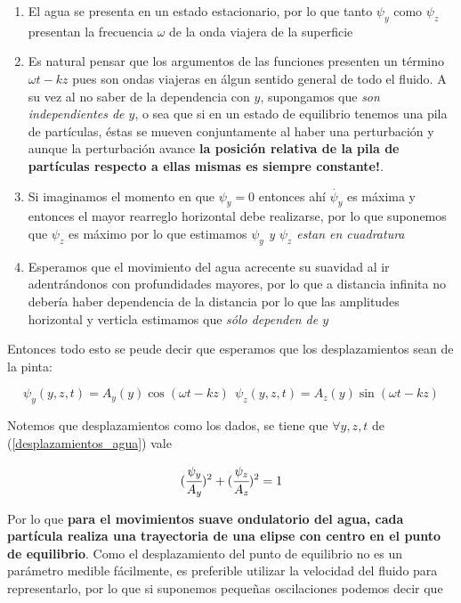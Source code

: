 \documentclass[a4paper,spanish]{article}
\numberwithin{equation}{section}
\begin{document}
\begin{enumerate}
\item El agua se presenta en un estado estacionario, por lo que tanto $\psi_y$ como $\psi_z$ presentan la frecuencia $\omega$ de la onda viajera de la superficie
\item Es natural pensar que los argumentos de las funciones presenten un t\'ermino $\omega t -kz$ pues son ondas viajeras en \'algun sentido general de todo el fluido. A su vez al no saber de la dependencia con $y$, supongamos que \textit{son independientes de $y$}, o sea que si en un estado de equilibrio tenemos una pila de part\'iculas, \'estas se mueven conjuntamente al haber una perturbaci\'on y aunque la perturbaci\'on avance \textbf{la posici\'on relativa de la pila de part\'iculas respecto a ellas mismas es siempre constante!}.
\item Si imaginamos el momento en que $\psi_y =0$ entonces ah\'i $\dot{\psi_y}$ es m\'axima y entonces el mayor rearreglo horizontal debe realizarse, por lo que suponemos que $\psi_z$ es m\'aximo por lo que estimamos \textit{$\psi_y$ y $\psi_z$ estan en cuadratura}
\item Esperamos que el movimiento del agua acrecente su suavidad al ir adentr\'andonos con profundidades mayores, por lo que a distancia infinita no deber\'ia haber dependencia de la distancia por lo que las amplitudes horizontal y verticla estimamos que \textit{s\'olo dependen de $y$}
\end{enumerate}

Entonces todo esto se peude decir que esperamos que los desplazamientos sean de la pinta:

\begin{equation}
\psi_y(y,z,t)=A_y(y)\cos{(\omega t -kz)}
\ \ 
\psi_z(y,z,t)=A_z(y)\sin{(\omega t -kz)}
\label{desplazamientos_agua}
\end{equation}

Notemos que desplazamientos como los dados, se tiene que $\forall y,z,t$ de (\ref{desplazamientos_agua}) vale

\[(\cfrac{\psi_y}{A_y})^2+(\cfrac{\psi_z}{A_z})^2 = 1\]

Por lo que \textbf{para el movimientos suave ondulatorio del agua, cada part\'icula realiza una trayectoria de una elipse con centro en el punto de equilibrio}. Como el desplazamiento del punto de equilibrio no es un par\'ametro medible f\'acilmente, es preferible utilizar la velocidad del fluido para representarlo, por lo que si suponemos peque\~nas oscilaciones podemos decir que 
\end{document}
